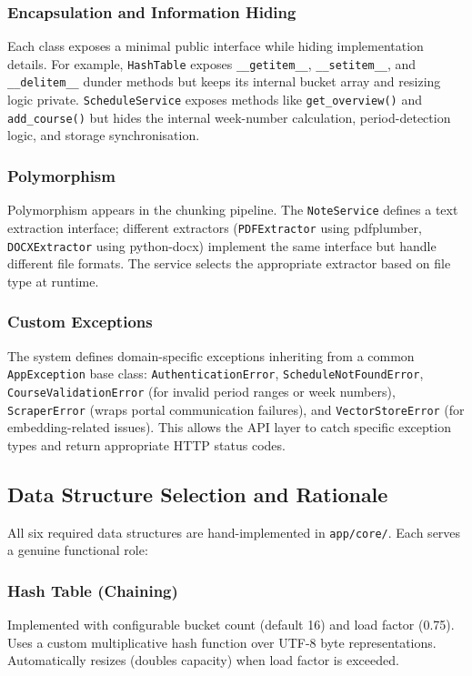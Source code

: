 \documentclass[11pt,a4paper]{article}
\begin{document}
\subsubsection{Encapsulation and Information Hiding}
Each class exposes a minimal public interface while hiding implementation details. For example, \texttt{HashTable} exposes \texttt{\_\_getitem\_\_}, \texttt{\_\_setitem\_\_}, and \texttt{\_\_delitem\_\_} dunder methods but keeps its internal bucket array and resizing logic private. \texttt{ScheduleService} exposes methods like \texttt{get\_overview()} and \texttt{add\_course()} but hides the internal week-number calculation, period-detection logic, and storage synchronisation.

\subsubsection{Polymorphism}
Polymorphism appears in the chunking pipeline. The \texttt{NoteService} defines a text extraction interface; different extractors (\texttt{PDFExtractor} using pdfplumber, \texttt{DOCXExtractor} using python-docx) implement the same interface but handle different file formats. The service selects the appropriate extractor based on file type at runtime.

\subsubsection{Custom Exceptions}
The system defines domain-specific exceptions inheriting from a common \texttt{AppException} base class: \texttt{AuthenticationError}, \texttt{ScheduleNotFoundError}, \texttt{CourseValidationError} (for invalid period ranges or week numbers), \texttt{ScraperError} (wraps portal communication failures), and \texttt{VectorStoreError} (for embedding-related issues). This allows the API layer to catch specific exception types and return appropriate HTTP status codes.

\subsection{Data Structure Selection and Rationale}
All six required data structures are hand-implemented in \texttt{app/core/}. Each serves a genuine functional role:

\subsubsection{Hash Table (Chaining)}
Implemented with configurable bucket count (default 16) and load factor (0.75). Uses a custom multiplicative hash function over UTF-8 byte representations. Automatically resizes (doubles capacity) when load factor is exceeded.
\end{document}
